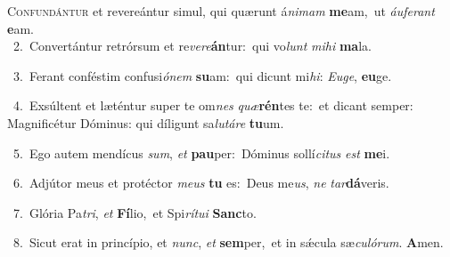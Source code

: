 \lettrine{\initial\textcolor{\initialcolor}{C}}{onfundántur} et revereántur simul, qui quærunt á\-\textit{ni}\-\textit{mam} \textbf{me}\-am,~\star ut \textit{áu}\-\textit{fe}\textit{rant} \textbf{e}\-am.\\
{\numbfont\textcolor{\numbcolor}{~2.}}~Convertántur retrórsum et re\-\textit{ve}\-\textit{re}\textbf{án}tur:~\star qui vo\textit{lunt} \textit{mi}\-\textit{hi} \textbf{ma}\-la.\par
{\numbfont\textcolor{\numbcolor}{~3.}}~Ferant conféstim confusi\-\textit{ó}\-\textit{nem} \textbf{su}\-am:~\star qui dicunt mi\-\textit{hi}\-: \textit{Eu}\-\textit{ge}, \textbf{eu}\-ge.\par
{\numbfont\textcolor{\numbcolor}{~4.}}~Exsúltent et læténtur super te om\textit{nes} \textit{quæ}\-\textbf{rén}tes te:~\star et dicant semper: Magnificétur Dóminus: qui díligunt sa\-\textit{lu}\-\textit{tá}\textit{re} \textbf{tu}\-um.\par
{\numbfont\textcolor{\numbcolor}{~5.}}~Ego autem mendícus \textit{sum}\-, \textit{et} \textbf{pau}\-per:~\star Dóminus sollí\-\textit{ci}\-\textit{tus} \textit{est} \textbf{me}\-i.\par
{\numbfont\textcolor{\numbcolor}{~6.}}~Adjútor meus et protéctor \textit{me}\-\textit{us} \textbf{tu} es:~\star Deus me\-\textit{us}\-, \textit{ne} \textit{tar}\-\textbf{dá}veris.\par
{\numbfont\textcolor{\numbcolor}{~7.}}~Glória Pa\-\textit{tri}\-, \textit{et} \textbf{Fí}\-lio,~\star et Spi\-\textit{rí}\-\textit{tu}\textit{i} \textbf{Sanc}\-to.\par
{\numbfont\textcolor{\numbcolor}{~8.}}~Sicut erat in princípio, et \textit{nunc}\-, \textit{et} \textbf{sem}\-per,~\star et in sǽcula sæ\-\textit{cu}\-\textit{ló}\textit{rum}. \textbf{A}\-men.\par
